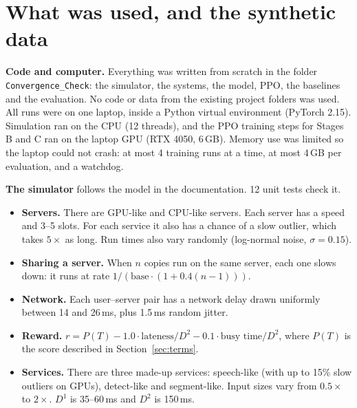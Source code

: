 \documentclass[10pt,a4paper]{article}
\begin{document}
\section{What was used, and the synthetic data}\label{sec:data}
\textbf{Code and computer.} Everything was written from scratch in the folder \texttt{Convergence\_Check}:
the simulator, the systems, the model, PPO, the baselines and the evaluation. No code or data from the existing
project folders was used. All runs were on one laptop, inside a Python virtual environment (PyTorch 2.15).
Simulation ran on the CPU (12 threads), and the PPO training steps for Stages B and C ran on the laptop GPU (RTX 4050,
6\,GB). Memory use was limited so the laptop could not crash: at most 4 training runs at a time, at most 4\,GB per
evaluation, and a watchdog.

\textbf{The simulator} follows the model in the documentation. 12 unit tests check it.
\begin{itemize}
\item \textbf{Servers.} There are GPU-like and CPU-like servers. Each server has a speed and 3--5 slots. For each service it also has a chance of a slow outlier, which takes $5\times$ as long. Run times also vary randomly (log-normal noise, $\sigma=0.15$).
\item \textbf{Sharing a server.} When $n$ copies run on the same server, each one slows down: it runs at rate $1/(\text{base}\cdot(1+0.4(n-1)))$.
\item \textbf{Network.} Each user--server pair has a network delay drawn uniformly between 14 and 26\,ms, plus 1.5\,ms random jitter.
\item \textbf{Reward.} $r=P(T)-1.0\cdot\text{lateness}/D^2-0.1\cdot\text{busy time}/D^2$, where $P(T)$ is the score described in Section~\ref{sec:terms}.
\item \textbf{Services.} There are three made-up services: speech-like (with up to 15\% slow outliers on GPUs), detect-like and segment-like. Input sizes vary from $0.5\times$ to $2\times$. $D^1$ is 35--60\,ms and $D^2$ is 150\,ms.
\end{itemize}
\end{document}
